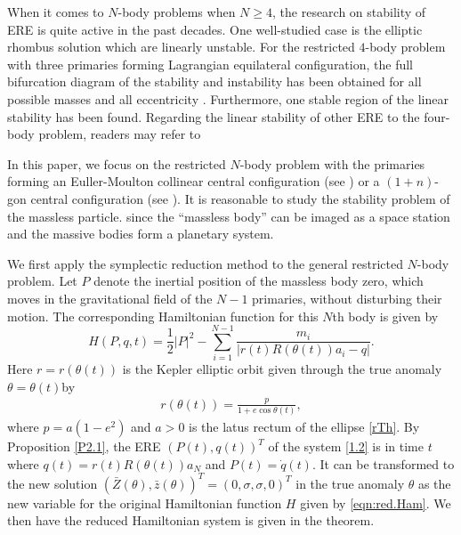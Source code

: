 \documentclass[11pt]{article}
\def\lb{\label}
\def\th{{\theta}}
\begin{document}
When it comes to $N$-body problems when $N\ge4$,
the research on stability of ERE is quite active in the past decades. 
One well-studied case is the elliptic rhombus solution \cite{Mansur2017, Leandro2018, Liu2021} which are linearly unstable. 
For the restricted $4$-body problem with three primaries forming Lagrangian equilateral configuration, the full bifurcation diagram of the stability and instability has been obtained for all possible masses and all eccentricity \cite{LiZ, Leandro2003}. Furthermore, one stable region of the linear stability has been found.
Regarding the linear stability of other ERE to the four-body problem, readers may refer to \cite{zhou2019linear, Hu2020}


In this paper, we focus on the restricted $N$-body problem with the primaries forming an Euller-Moulton collinear central configuration 
(see \cite{ZhonLong2017CMDA})
or a $(1+n)$-gon central configuration (see \cite{Maxwell,Hu2020}).
It is reasonable to study the stability problem of the
massless particle.
since the
“massless body” can be imaged as a space station and the massive bodies form a planetary system.

We first apply the symplectic reduction method \cite{MS} to the general restricted $N$-body problem. 
Let $P$ denote the inertial position of the massless body zero, which moves in the gravitational field of the $N-1$ primaries, without disturbing their motion. The corresponding 
 Hamiltonian function for this $N$th body is given by
\begin{equation}
H(P,q, t)=\frac{1}{2}|P|^2-\sum_{i=1}^{N-1}
\frac{m_i}{|r(t)R(\th(t))a_i-q|}.\lb{HaFun}
\end{equation}
Here $r=r(\theta(t))$ is the Kepler elliptic orbit given through the true anomaly $\th=\th(t)$by
\begin{align}
  r(\th(t)) = \frac{p}{1+e\cos\th(t)},  \lb{rTh}
\end{align}
where $p=a(1-e^2)$ and $a>0$ is the latus rectum of the ellipse \eqref{rTh}.
By Proposition \ref{P2.1}, the ERE $(P(t),q(t))^T$  of the system \eqref{1.2} is in time $t$ where $q(t)=r(t)R(\theta(t))a_{N}$ and $P(t)=\dot{q}(t)$. It 
can be transformed to the new solution $(\bar{Z}(\theta),\bar{z}(\theta))^T = (0,\sigma,\sigma,0)^T$ in the true anomaly $\theta$ as the new
variable for the original Hamiltonian function $H$ given by \eqref{eqn:red.Ham}. We then have the reduced Hamiltonian system is given in the theorem.
\end{document}

